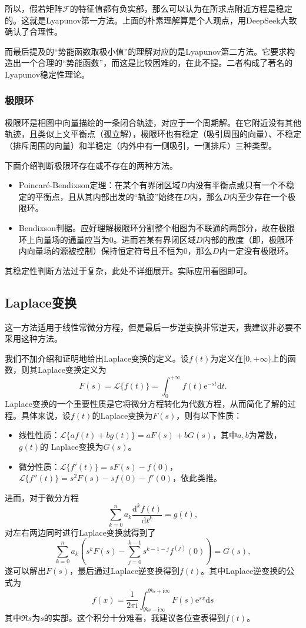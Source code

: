\documentclass[a4paper, 12pt]{article}
\begin{document}
    所以，假若矩阵$\mathcal F$的特征值都有负实部，那么可以认为在所求点附近方程是稳定的。这就是Lyapunov第一方法。上面的朴素理解算是个人观点，用DeepSeek大致确认了合理性。

    而最后提及的“势能函数取极小值”的理解对应的是Lyapunov第二方法。它要求构造出一个合理的“势能函数”，而这是比较困难的，在此不提。二者构成了著名的Lyapunov稳定性理论。

    \subsubsection{极限环}

    极限环是相图中向量描绘的一条闭合轨迹，对应于一个周期解。在它附近没有其他轨迹，且类似上文平衡点（孤立解），极限环也有稳定（吸引周围的向量）、不稳定（排斥周围的向量）和半稳定（内外中有一侧吸引，一侧排斥）三种类型。

    下面介绍判断极限环存在或不存在的两种方法。
    \begin{itemize}
        \item Poincaré-Bendixson定理：在某个有界闭区域$D$内没有平衡点或只有一个不稳定的平衡点，且从其内部出发的“轨迹”始终在$D$内，那么$D$内至少存在一个极限环。
        \item Bendixson判据。应好理解极限环分割整个相图为不联通的两部分，故在极限环上向量场的通量应当为0。进而若某有界闭区域$D$内部的散度（即，极限环内向量场的源被控制）保持恒定符号且不恒为0，那么$D$内一定没有极限环。
    \end{itemize}

    其稳定性判断方法过于复杂，此处不详细展开。实际应用看图即可。

    \subsection{Laplace变换}

    这一方法适用于线性常微分方程，但是最后一步逆变换非常逆天，我建议非必要不采用这种方法。

    我们不加介绍和证明地给出Laplace变换的定义。设$f(t)$为定义在$[0,+\infty)$上的函数，则其Laplace变换定义为
    \[
    F(s)=\mathcal{L}\{f(t)\}=\int_0^{+\infty}f(t)\mathrm e^{-st}\mathrm dt.
    \]
    Laplace变换的一个重要性质是它将微分方程转化为代数方程，从而简化了解的过程。具体来说，设$f(t)$的Laplace变换为$F(s)$，则有以下性质：
    \begin{itemize}
        \item 线性性质：$\mathcal{L}\{af(t)+bg(t)\}=aF(s)+bG(s)$，其中$a,b$为常数，$g(t)$的 Laplace变换为$G(s)$。
        \item 微分性质：$\mathcal{L}\{f'(t)\}=sF(s)-f(0)$，$\mathcal{L}\{f''(t)\}=s^2F(s)-sf(0)-f'(0)$，依此类推。
    \end{itemize}
    进而，对于微分方程
    \[
    \sum_{k=0}^n a_k \frac{\mathrm d^k f(t)}{\mathrm dt^k} = g(t),
    \]
    对左右两边同时进行Laplace变换就得到了
    \[
    \sum_{k=0}^n a_k \left(s^k F(s) - \sum_{j=0}^{k-1} s^{k-1-j} f^{(j)}(0)\right) = G(s),
    \]
    遂可以解出$F(s)$，最后通过Laplace逆变换得到$f(t)$。其中Laplace逆变换的公式为
    \[
    f(x)=\frac{1}{2\pi\mathrm i}\int_{\Re s-\mathrm i\infty}^{\Re s+\mathrm i\infty}F(s)\mathrm e^{sx}\mathrm ds
    \]
    其中$\Re s$为$s$的实部。这个积分十分难看，我建议各位查表得到$f(t)$。
\end{document}
